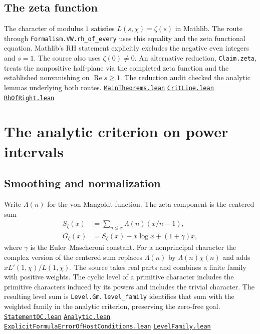 \documentclass[11pt,a4paper]{article}
\newcommand{\repo}{https://github.com/LiRunGuo/riemann-lean-verification}
\newcommand{\code}[1]{\texttt{#1}}
\newcommand{\src}[2]{\href{\repo/blob/main/lean/src/#1}{\mbox{\nolinkurl{#2}}}}
\newcommand{\pc}{Development/AutomorphicArithmetic/PrimitiveCosets}
\newcommand{\hc}{Formalism/SharpRestriction/RamificationFrobenius/TotientGaloisClasses}
\newcommand{\RePart}{\operatorname{Re}}
\begin{document}
\subsection*{The zeta function}

The character of modulus $1$ satisfies
$L(s,\chi)=\zeta(s)$ in Mathlib. The route through
\code{Formalism.VW.rh\_of\_every} uses this equality and the zeta functional
equation. Mathlib's RH statement explicitly excludes the negative even
integers and $s=1$. The source also uses $\zeta(0)\ne0$. An alternative
reduction, \code{Claim.zeta}, treats the nonpositive half-plane via the
completed zeta function and the established nonvanishing on $\RePart s\ge1$.
The reduction audit checked the analytic lemmas underlying both routes.
\src{Supplements/Kernels/MainTheorems.lean}{MainTheorems.lean}
\src{Formalism/GammaFactorNonvanishing/CritLine.lean}{CritLine.lean}
\src{Formalism/GammaFactorNonvanishing/RhOfRight.lean}{RhOfRight.lean}

\clearpage
\section{The analytic criterion on power intervals}

\subsection*{Smoothing and normalization}

Write $\Lambda(n)$ for the von Mangoldt function. The zeta component is the
centered sum
\begin{align*}
 S_\zeta(x)&=\sum_{n\le x}\Lambda(n)(x/n-1),\\
 G_\zeta(x)&=S_\zeta(x)-x\log x+(1+\gamma)x,
\end{align*}
where $\gamma$ is the Euler--Mascheroni constant. For a nonprincipal character
the complex version of the centered sum replaces $\Lambda(n)$ by
$\Lambda(n)\chi(n)$ and adds $xL'(1,\chi)/L(1,\chi)$. The source takes real
parts and combines a finite family with positive weights. The cyclic level of
a primitive character includes the primitive characters induced by its
powers and includes the trivial character. The resulting level sum is
\code{Level.Gm}. \code{level\_family} identifies that sum with the
weighted family in the analytic criterion, preserving the zero-free goal.
\src{Formalism/StatementOC.lean}{StatementOC.lean}
\src{\hc/Analytic.lean}{Analytic.lean}
\src{\hc/ExplicitFormulaErrorOfHostConditions.lean}{ExplicitFormulaErrorOfHostConditions.lean}
\src{\pc/LevelFamily.lean}{LevelFamily.lean}
\end{document}
